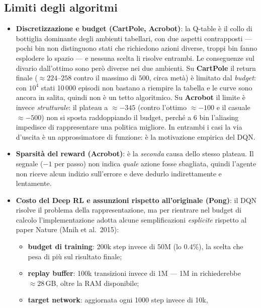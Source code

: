 \subsection{Limiti degli algoritmi}
\begin{itemize}
  \item \textbf{Discretizzazione e budget (CartPole, Acrobot)}: la Q-table \`e il collo di
        bottiglia dominante degli ambienti tabellari, con due aspetti contrapposti --- pochi
        bin non distinguono stati che richiedono azioni diverse, troppi bin fanno esplodere
        lo spazio --- e nessuna scelta li risolve entrambi. Le conseguenze sul divario
        dall'ottimo sono per\`o diverse nei due ambienti. Su \textbf{CartPole} il return
        finale ($\approx 224$--$258$ contro il massimo di $500$, circa met\`a) \`e limitato
        dal \emph{budget}: con $10^4$ stati 10\,000 episodi non bastano a riempire la
        tabella e le curve sono ancora in salita, quindi non \`e un tetto algoritmico. Su
        \textbf{Acrobot} il limite \`e invece \emph{strutturale}: il plateau a
        $\approx -345$ (contro l'ottimo $\approx -100$ e il casuale $\approx -500$) non si
        sposta raddoppiando il budget, perch\'e a 6 bin l'aliasing impedisce di
        rappresentare una politica migliore. In entrambi i casi la via d'uscita \`e un
        approssimatore di funzione: \`e la motivazione empirica del DQN.
  \item \textbf{Sparsit\`a del reward (Acrobot)}: \`e la \emph{seconda} causa dello stesso
        plateau. Il segnale ($-1$ per passo) non indica \emph{quale} azione fosse
        sbagliata, quindi l'agente non riceve alcun indizio sull'errore e deve dedurlo
        indirettamente e lentamente.
  \item \textbf{Costo del Deep RL e assunzioni rispetto all'originale (Pong)}: il DQN
        risolve il problema della rappresentazione, ma per rientrare nel budget di calcolo
        l'implementazione adotta alcune semplificazioni \emph{esplicite} rispetto al paper
        Nature (Mnih et al.\ 2015):
        \begin{itemize}
          \item \textbf{budget di training}: 200k step invece di 50M (lo $0.4\%$), la
                scelta che pesa di pi\`u sul risultato finale;
          \item \textbf{replay buffer}: 100k transizioni invece di 1M --- 1M in
                 richiederebbe $\approx 28$\,GB, oltre la RAM disponibile;
          \item \textbf{target network}: aggiornata ogni 1000 step invece di 10k,

\end{itemize}
\end{itemize}
